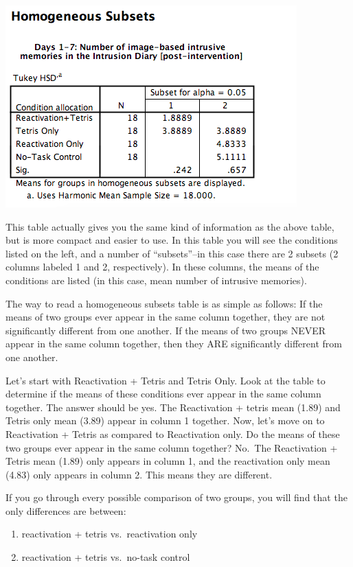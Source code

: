 \documentclass[
]{book}
\providecommand{\tightlist}{%
  \setlength{\itemsep}{0pt}\setlength{\parskip}{0pt}}
\begin{document}
\includegraphics{img/8.4.22.png}

This table actually gives you the same kind of information as the above table, but is more compact and easier to use. In this table you will see the conditions listed on the left, and a number of ``subsets''--in this case there are 2 subsets (2 columns labeled 1 and 2, respectively). In these columns, the means of the conditions are listed (in this case, mean number of intrusive memories).

The way to read a homogeneous subsets table is as simple as follows: If the means of two groups ever appear in the same column together, they are not significantly different from one another. If the means of two groups NEVER appear in the same column together, then they ARE significantly different from one another.

Let's start with Reactivation + Tetris and Tetris Only. Look at the table to determine if the means of these conditions ever appear in the same column together. The answer should be yes. The Reactivation + tetris mean (1.89) and Tetris only mean (3.89) appear in column 1 together. Now, let's move on to Reactivation + Tetris as compared to Reactivation only. Do the means of these two groups ever appear in the same column together? No.~The Reactivation + Tetris mean (1.89) only appears in column 1, and the reactivation only mean (4.83) only appears in column 2. This means they are different.

If you go through every possible comparison of two groups, you will find that the only differences are between:

\begin{enumerate}
\def\labelenumi{\arabic{enumi}.}
\tightlist
\item
  reactivation + tetris vs.~reactivation only
\item
  reactivation + tetris vs.~no-task control
\end{enumerate}
\end{document}
